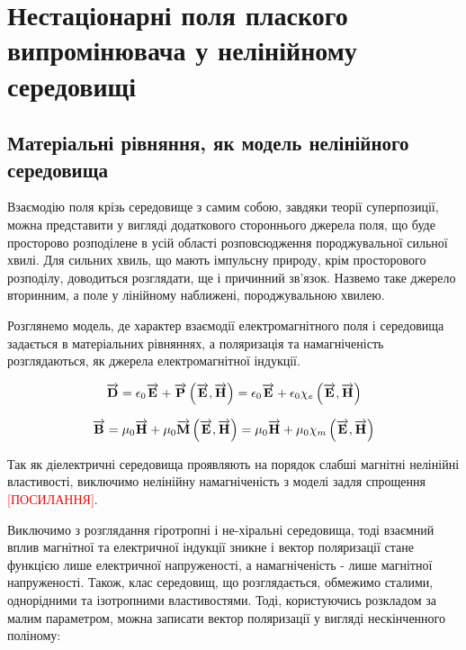 \chapter{Нестаціонарні поля плаского випромінювача у нелінійному середовищі}
\label{ch:nonlinear}

\section{Матеріальні рівняння, як модель нелінійного середовища}

Взаємодію поля крізь середовище з самим собою, завдяки теорії суперпозиції,
можна представити у вигляді додаткового стороннього джерела поля, що буде
просторово розподілене в усій області розповсюдження породжувальної
сильної хвилі. Для сильних хвиль, що мають імпульсну природу,
крім просторового розподілу, доводиться розглядати, ще і причинний
зв'язок. Назвемо таке джерело вторинним, а поле у лінійному наближені,
породжувальною хвилею.

Розглянемо модель, де характер взаємодії електромагнітного поля і середовища 
задається в матеріальних рівняннях, а поляризація та намагніченість 
розглядаються, як джерела електромагнітної індукції.

\begin{equation*}
\overrightarrow{\mathbf D} = \epsilon_0 \overrightarrow{\mathbf E} + \overrightarrow{\mathbf P} \left( \overrightarrow{\mathbf E}, \overrightarrow{\mathbf H} \right) =
\epsilon_0 \overrightarrow{\mathbf E} + \epsilon_0 \chi_e \left( \overrightarrow{\mathbf E}, \overrightarrow{\mathbf H} \right)
\end{equation*}

\begin{equation*}
\overrightarrow{\mathbf B} = \mu_0 \overrightarrow{\mathbf H} + \mu_0 \overrightarrow{\mathbf M} \left( \overrightarrow{\mathbf E}, \overrightarrow{\mathbf H} \right) =
\mu_0 \overrightarrow{\mathbf H} + \mu_0 \chi_m \left( \overrightarrow{\mathbf E}, \overrightarrow{\mathbf H} \right)
\end{equation*}

Так як діелектричні середовища проявляють на порядок слабші магнітні
нелінійні властивості, виключимо нелінійну намагніченість з моделі задля
спрощення \textcolor{red}{[ПОСИЛАННЯ]}.

Виключимо з розглядання гіротропні і не-хіральні середовища, тоді взаємний 
вплив магнітної та електричної індукції зникне і вектор поляризації стане 
функцією лише електричної напруженості, а намагніченість - лише магнітної
напруженості. Також, клас середовищ, що розглядається, обмежимо сталими, 
однорідними та ізотропними властивостями. Тоді, користуючись розкладом за 
малим параметром, можна записати вектор поляризації у вигляді нескінченного 
поліному:

